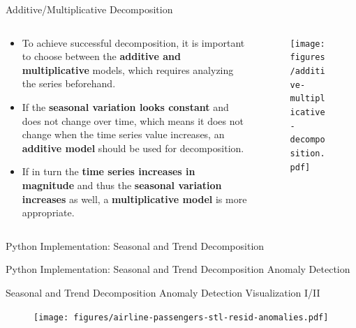 \documentclass[document.tex]{subfiles}
\begin{document}
    \begin{frame}{Additive/Multiplicative Decomposition}
        \begin{columns}
            \begin{column}{.6\textwidth}
                \begin{itemize}
                    \item To achieve successful decomposition, it is important to choose between the \textbf{additive and multiplicative} models, which requires analyzing the series beforehand.
                    \item If the \textbf{seasonal variation looks constant} and does not change over time, which means it does not change when the time series value increases, an \textbf{additive model} should be used for decomposition.
                    \item If in turn the \textbf{time series increases in magnitude} and thus the \textbf{seasonal variation increases} as well, a \textbf{multiplicative model} is more appropriate.
                \end{itemize}
            \end{column}
            \begin{column}{.4\textwidth}
                \begin{figure}
                    \label{fig:additive-multiplicative-decomposition}
                    \texttt{[image: figures/additive-multiplicative-decomposition.pdf]}
                \end{figure}
            \end{column}
        \end{columns}
    \end{frame}

    \begin{frame}{Python Implementation: Seasonal and Trend Decomposition}
        
    \end{frame}

    \begin{frame}{Python Implementation: Seasonal and Trend Decomposition Anomaly Detection}
        
    \end{frame}
    
    \begin{frame}{Seasonal and Trend Decomposition Anomaly Detection Visualization I/II}
        \begin{figure}
            \label{fig:airline-passengers-stl-resid-anomalies}
            \texttt{[image: figures/airline-passengers-stl-resid-anomalies.pdf]}
        \end{figure}
    \end{frame}
\end{document}
